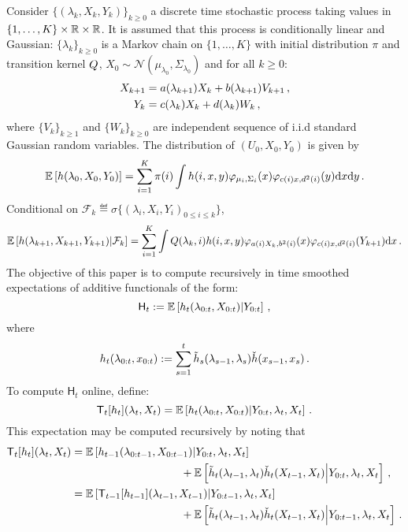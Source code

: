 Consider $\{(\lambda_k,X_k,Y_k)\}_{k\ge 0}$ a discrete time stochastic process taking values in $\{1,\ldots,K\}\times\mathbb{R}\times\mathbb{R}$. It is assumed that this process is conditionally linear and Gaussian: $\{\lambda_k\}_{k\ge 0}$ is a Markov chain on $\{1,\ldots,K\}$ with initial distribution $\pi$ and transition kernel $Q$, $X_0\sim \mathcal{N}(\mu_{\lambda_0},\Sigma_{\lambda_0})$ and for all $k\ge 0$: 
\begin{align*}
X_{k+1 }& = a(\lambda_{k+1})X_{k} + b(\lambda_{k+1})V_{k+1}\,,\\ 
Y_k & = c(\lambda_k)X_{k} + d(\lambda_k)W_k\,,
\end{align*}
where $\{V_k\}_{k\ge 1}$ and $\{W_k\}_{k\ge 0}$ are independent sequence of i.i.d standard Gaussian random variables. The distribution of $(U_0,X_0,Y_0)$ is given by 
\[
\mathbb{E}\left[h(\lambda_0,X_0,Y_0)\right] = \sum_{i=1}^K\pi(i)\int h(i,x,y)\varphi_{\mu_i,\Sigma_i}(x)\varphi_{c(i)x,d^2(i)}(y)\mathrm{d} x\mathrm{d} y\,.
\]
Conditional on $\mathcal{F}_{k} \eqdef \sigma\{(\lambda_i,X_i,Y_i)_{0\le i \le k}\}$,
\begin{equation*}
\mathbb{E}\left[h(\lambda_{k+1},X_{k+1},Y_{k+1})\middle| \mathcal{F}_{k}\right] = \sum_{i=1}^K\int Q(\lambda_{k},i)h(i,x,y)\varphi_{a(i)X_k,b^2(i)}(x)\varphi_{c(i)x,d^2(i)}(Y_{k+1})\mathrm{d} x\,.
\end{equation*}
The objective of this paper is to compute recursively in time smoothed expectations of additive functionals of the form:
\begin{equation}
\label{eq:add:func:smoothed}
\mathsf{H}_t := \mathbb{E}\left[h_t(\lambda_{0:t},X_{0:t})\middle|Y_{0:t}\right]\,,
\end{equation} 
where
\begin{equation}
\label{eq:add:func}
h_t(\lambda_{0:t},x_{0:t}) := \sum_{s=1}^{t}\tilde{h}_s(\lambda_{s-1},\lambda_s)\check{h}(x_{s-1},x_s) \,.
\end{equation}
To compute $\mathsf{H}_t $ online, define: 
\[
\mathsf{T}_t[h_t](\lambda_t,X_t) = \mathbb{E}\left[h_t(\lambda_{0:t},X_{0:t})\middle|Y_{0:t},\lambda_t,X_t\right]\,.
\]
This expectation may be computed recursively by noting that
\begin{align*}
\mathsf{T}_t[h_t](\lambda_t,X_t) &= \mathbb{E}\left[h_{t-1}(\lambda_{0:t-1},X_{0:t-1})\middle|Y_{0:t},\lambda_t,X_t\right] \\
&\hspace{3.5cm}+ \mathbb{E}\left[\tilde{h}_t(\lambda_{t-1},\lambda_t)\check{h}_t(X_{t-1},X_t)\middle|Y_{0:t},\lambda_t,X_t\right]\eqsp,\\
&= \mathbb{E}\left[\mathsf{T}_{t-1}[h_{t-1}](\lambda_{t-1},X_{t-1}) \middle|Y_{0:t-1},\lambda_{t},X_t\right] \\
&\hspace{3.5cm}+ \mathbb{E}\left[\tilde{h}_t(\lambda_{t-1},\lambda_t)\check{h}_t(X_{t-1},X_t)\middle|Y_{0:t-1},\lambda_t,X_t\right]\eqsp.
\end{align*}
